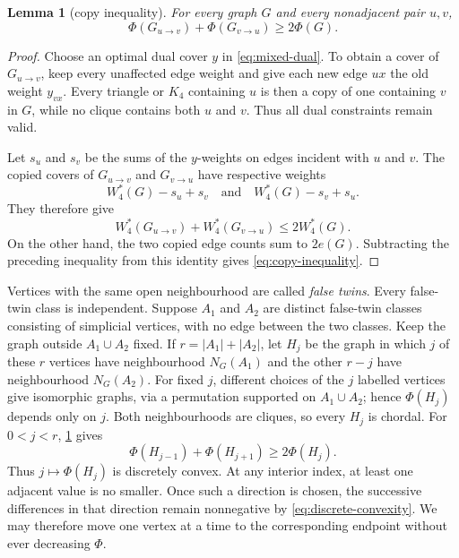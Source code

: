 \documentclass[11pt,reqno]{amsart}
\numberwithin{equation}{section}
\newtheorem{lemma}[theorem]{Lemma}
\theoremstyle{definition}
\theoremstyle{remark}
\newcommand{\Wfrac}{W_4^*}
\newcommand{\PhiF}{\Phi}
\begin{document}
\begin{lemma}[copy inequality]\label{lem:copy-inequality}
For every graph $G$ and every nonadjacent pair $u,v$,
\begin{equation}\label{eq:copy-inequality}
  \PhiF(G_{u\to v})+\PhiF(G_{v\to u})\geq2\PhiF(G).
\end{equation}
\end{lemma}

\begin{proof}
Choose an optimal dual cover $y$ in \eqref{eq:mixed-dual}.  To obtain a cover
of $G_{u\to v}$, keep every unaffected edge weight and give each new edge
$ux$ the old weight $y_{vx}$.  Every triangle or $K_4$ containing $u$ is then
a copy of one containing $v$ in $G$, while no clique contains both $u$ and
$v$.  Thus all dual constraints remain valid.

Let $s_u$ and $s_v$ be the sums of the $y$-weights on edges incident with $u$
and $v$.  The copied covers of $G_{u\to v}$ and $G_{v\to u}$ have respective
weights
\[
  \Wfrac(G)-s_u+s_v
  \quad\text{and}\quad
  \Wfrac(G)-s_v+s_u.
\]
They therefore give
\[
  \Wfrac(G_{u\to v})+\Wfrac(G_{v\to u})
  \leq2\Wfrac(G).
\]
On the other hand, the two copied edge counts sum to $2e(G)$.  Subtracting the
preceding inequality from this identity gives
\eqref{eq:copy-inequality}.
\end{proof}

Vertices with the same open neighbourhood are called \emph{false twins}.
Every false-twin class is independent.  Suppose $A_1$ and $A_2$ are distinct
false-twin classes consisting of simplicial vertices, with no edge between
the two classes.  Keep the graph outside $A_1\cup A_2$ fixed.  If
$r=|A_1|+|A_2|$, let $H_j$ be the graph in which $j$ of these $r$ vertices
have neighbourhood $N_G(A_1)$ and the other $r-j$ have neighbourhood
$N_G(A_2)$.  For fixed $j$, different choices of the $j$ labelled vertices
give isomorphic graphs, via a permutation supported on $A_1\cup A_2$; hence
$\PhiF(H_j)$ depends only on $j$.  Both neighbourhoods are cliques, so every
$H_j$ is chordal.
For $0<j<r$, \cref{lem:copy-inequality} gives
\begin{equation}\label{eq:discrete-convexity}
  \PhiF(H_{j-1})+\PhiF(H_{j+1})\geq2\PhiF(H_j).
\end{equation}
Thus $j\mapsto\PhiF(H_j)$ is discretely convex.  At any interior index, at
least one adjacent value is no smaller.  Once such a direction is chosen,
the successive differences in that direction remain nonnegative by
\eqref{eq:discrete-convexity}.  We may therefore move one vertex at a time to
the corresponding endpoint without ever decreasing $\PhiF$.
\end{document}
